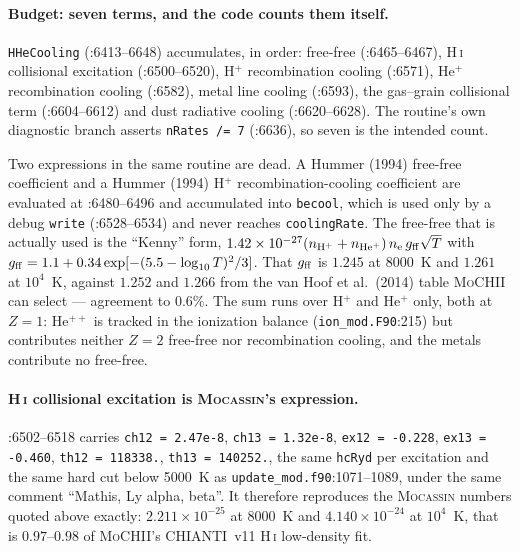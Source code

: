 \documentclass[english,a4paper]{my_memo}
\newcommand{\code}[1]{\texttt{#1}}
\newcommand{\MoCHII}{\textsc{MoCHII}}
\newcommand{\Mocassin}{\textsc{Mocassin}}
\newcommand{\HI}{H\,\textsc{i}}
\newcommand{\nel}{n_{\rm e}}
\begin{document}
\paragraph{Budget: seven terms, and the code counts them itself.}
\code{HHeCooling} (:6413--6648) accumulates, in order: free-free (:6465--6467),
\HI{} collisional excitation (:6500--6520), H$^+$ recombination cooling
(:6571), He$^+$ recombination cooling (:6582), metal line cooling (:6593),
the gas--grain collisional term (:6604--6612) and dust radiative cooling
(:6620--6628).  The routine's own diagnostic branch asserts
\code{nRates /= 7} (:6636), so seven is the intended count.

Two expressions in the same routine are dead.  A Hummer (1994) free-free
coefficient and a Hummer (1994) H$^+$ recombination-cooling coefficient are
evaluated at :6480--6496 and accumulated into \code{becool}, which is used
only by a debug \code{write} (:6528--6534) and never reaches
\code{coolingRate}.  The free-free that is actually used is the ``Kenny''
form, $1.42\times10^{-27}(n_{\rm H^+} + n_{\rm He^+})\,\nel\,
g_{\rm ff}\sqrt{T}$ with $g_{\rm ff} = 1.1 + 0.34\exp[-(5.5-\log_{10}T)^2/3]$.
That $g_{\rm ff}$ is $1.245$ at 8000~K and $1.261$ at $10^4$~K, against
$1.252$ and $1.266$ from the van Hoof et al.\ (2014) table \MoCHII{} can
select --- agreement to $0.6\%$.  The sum runs over H$^+$ and He$^+$ only, both
at $Z = 1$: He$^{++}$ is tracked in the ionization balance
(\code{ion\_mod.F90}:215) but contributes neither $Z = 2$ free-free nor
recombination cooling, and the metals contribute no free-free.

\paragraph{\HI{} collisional excitation is \Mocassin{}'s expression.}
:6502--6518 carries \code{ch12 = 2.47e-8}, \code{ch13 = 1.32e-8},
\code{ex12 = -0.228}, \code{ex13 = -0.460}, \code{th12 = 118338.},
\code{th13 = 140252.}, the same \code{hcRyd} per excitation and the same hard
cut below 5000~K as \code{update\_mod.f90}:1071--1089, under the same comment
``Mathis, Ly alpha, beta''.  It therefore reproduces the \Mocassin{} numbers
quoted above exactly: $2.211\times10^{-25}$ at 8000~K and
$4.140\times10^{-24}$ at $10^4$~K, that is $0.97$--$0.98$ of \MoCHII{}'s
CHIANTI~v11 \HI{} low-density fit.
\end{document}

